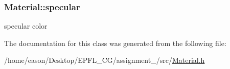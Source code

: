 \subsubsection[{\texorpdfstring{specular}{specular}}]{ Material\+::specular}\hypertarget{structMaterial_ab98526482184fa4cab89a33f6c13d033}{}\label{structMaterial_ab98526482184fa4cab89a33f6c13d033}


specular color 



The documentation for this class was generated from the following file\+:\begin{DoxyCompactItemize}
\item 
/home/eason/\+Desktop/\+E\+P\+F\+L\+\_\+\+C\+G/assignment\+\_/src/\hyperlink{Material_8h}{Material.\+h}\end{DoxyCompactItemize}
